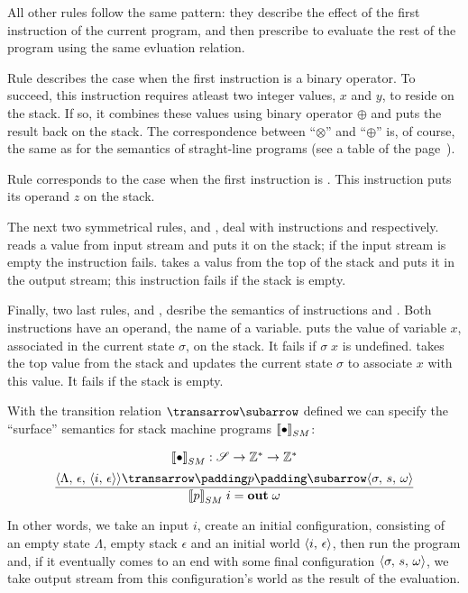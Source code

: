 All other rules follow the same pattern: they describe the effect of the first instruction of the current program,
and then prescribe to evaluate the rest of the program using the same evluation relation.

Rule  describes the case when the first instruction is a binary operator. To succeed, this instruction
requires atleast two integer values, $x$ and $y$, to reside on the stack. If so, it combines these values using binary
operator $\oplus$ and puts the result back on the stack. The correspondence between ``$\otimes$'' and ``$\oplus$'' is,
of course, the same as for the semantics of straght-line programs (see a table of the page~\pageref{times-plus-tab}).

Rule  corresponds to the case when the first instruction is . This instruction
puts its operand $z$ on the stack.

The next two symmetrical rules,  and , deal with instructions  and
 respectively.  reads a value from input stream and puts it on the stack; if the input stream is
empty the instruction fails.  takes a valus from the top of the stack and puts it in the output stream; this
instruction fails if the stack is empty.

Finally, two last rules,  and , desribe the semantics of instructions  and
. Both instructions have an operand, the name of a variable.  puts the value of variable $x$, associated
in the current state $\sigma$, on the stack. It fails if $\sigma\;x$ is undefined.  takes the top value from the
stack and updates the current state $\sigma$ to associate $x$ with this value. It fails if the stack is empty.

With the transition relation $\transrel$ defined we can specify the ``surface'' semantics for stack machine programs $\sembr{\bullet}^\ph_{SM}$:

\[
  \begin{array}{c}
    \sembr{\bullet}^\ph_{SM} : \mathscr{S}\to \mathbb{Z}^*\to \mathbb{Z}^*\\[2mm]
      \trule{\trans{\inbr{\Lambda,\,\epsilon,\,\inbr{i,\,\epsilon}}}{p}{\inbr{\sigma,\,s,\,\omega}}}
            {\sembr{p}^\ph_{SM}\;i=\primi{out}{\;\omega}}
  \end{array}
\]

In other words, we take an input $i$, create an initial configuration, consisting of an empty state $\Lambda$, empty stack $\epsilon$ and an
initial world $\left<{i,\,\epsilon}\right>$, then run the program and, if it eventually comes to an end with some final configuration $\left<{\sigma,\,s,\,\omega}\right>$, we take
output stream from this configuration's world as the result of the evaluation.

